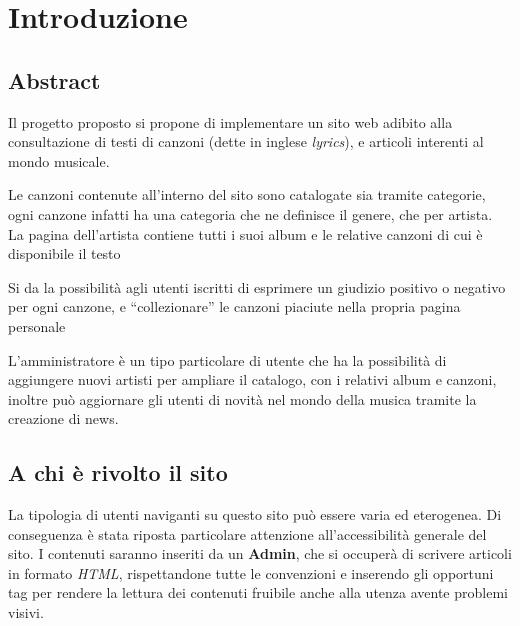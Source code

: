 \section{Introduzione}

\subsection{Abstract}
Il progetto proposto si propone di implementare un sito web adibito alla consultazione di testi di canzoni (dette in inglese \textit{lyrics}), e articoli interenti al mondo musicale.

Le canzoni contenute all'interno del sito sono catalogate sia tramite categorie, ogni canzone infatti ha una categoria che ne definisce il genere, che per artista.
La pagina dell'artista contiene tutti i suoi album e le relative canzoni di cui è disponibile il testo

Si da la possibilità agli utenti iscritti di esprimere un giudizio positivo o negativo per ogni canzone, e ``collezionare'' le canzoni piaciute nella propria pagina personale

L'amministratore è un tipo particolare di utente che ha la possibilità di aggiungere nuovi artisti per ampliare il catalogo, con i relativi album e canzoni, inoltre può aggiornare gli utenti di novità nel mondo della musica tramite la creazione di news.


\subsection{A chi è rivolto il sito}
La tipologia di utenti naviganti su questo sito può essere varia ed eterogenea. Di conseguenza è stata riposta particolare attenzione all'accessibilità generale del sito. I contenuti saranno inseriti da un \textbf{Admin}, che si occuperà di scrivere articoli in formato \textit{HTML}, rispettandone tutte le convenzioni e inserendo gli opportuni tag per rendere la lettura dei contenuti fruibile anche alla utenza avente problemi visivi.
